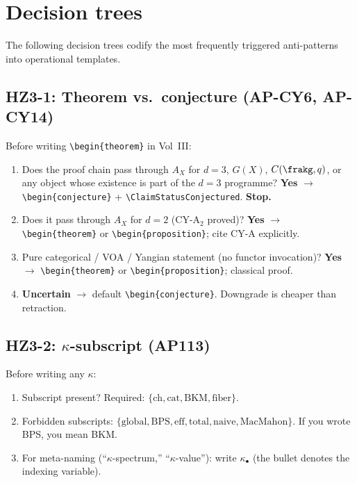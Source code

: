\section{Decision trees}
\label{sec:ap-decision-trees}

The following decision trees codify the most frequently triggered
anti-patterns into operational templates.

\subsection{HZ3-1: Theorem vs.\ conjecture (AP-CY6, AP-CY14)}

Before writing \verb|\begin{theorem}| in Vol~III:
\begin{enumerate}[nosep]
\item Does the proof chain pass through $A_X$ for $d = 3$, $G(X)$,
      $C(\frakg,q)$, or any object whose existence is part of the
      $d = 3$ programme?
      \textbf{Yes} $\to$ \verb|\begin{conjecture}| +
      \verb|\ClaimStatusConjectured|.  \textbf{Stop.}
\item Does it pass through $A_X$ for $d = 2$ (CY-A$_2$ proved)?
      \textbf{Yes} $\to$ \verb|\begin{theorem}| or
      \verb|\begin{proposition}|; cite CY-A explicitly.
\item Pure categorical / VOA / Yangian statement (no functor
      invocation)?
      \textbf{Yes} $\to$ \verb|\begin{theorem}| or
      \verb|\begin{proposition}|; classical proof.
\item \textbf{Uncertain} $\to$ default \verb|\begin{conjecture}|.
      Downgrade is cheaper than retraction.
\end{enumerate}

\subsection{HZ3-2: $\kappa$-subscript (AP113)}

Before writing any $\kappa$:
\begin{enumerate}[nosep]
\item Subscript present?  Required: $\{\mathrm{ch}, \mathrm{cat},
      \mathrm{BKM}, \mathrm{fiber}\}$.
\item Forbidden subscripts: $\{\mathrm{global}, \mathrm{BPS},
      \mathrm{eff}, \mathrm{total}, \mathrm{naive},
      \mathrm{MacMahon}\}$.
      If you wrote BPS, you mean BKM.
\item For meta-naming (``$\kappa$-spectrum,'' ``$\kappa$-value''):
      write $\kappa_\bullet$ (the bullet denotes the indexing
      variable).
\end{enumerate}

